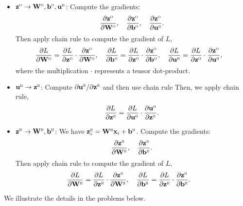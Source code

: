 \documentclass[11pt]{article}
\def\arr{\rightarrow}
\newcommand{\bbf}{\mathbf{b}}
\newcommand{\ubf}{\mathbf{u}}
\newcommand{\xbf}{\mathbf{x}}
\newcommand{\zbf}{\mathbf{z}}
\newcommand{\Wbf}{\mathbf{W}}
\def\hid{\textsc{\tiny H}}
\def\out{\textsc{\tiny O}}
\begin{document}
\begin{itemize}
\begin{itemize}
\item $\zbf^\out \arr \Wbf^\out, \bbf^\out, \ubf^\hid$: Compute the gradients:
\[
    \frac{\partial \zbf^\out}{\partial \Wbf^\out}, \quad
    \frac{\partial \zbf^\out}{\partial \bbf^\out}, \quad
    \frac{\partial \zbf^\out}{\partial \ubf^\hid}.
\]
Then apply chain rule to compute the gradient of $L$,
\begin{align*}
    \frac{\partial L}{\partial \Wbf^\out} &= \frac{\partial L}{\partial \zbf^\out} \cdot \frac{\partial \zbf^\out}{\partial \Wbf^\out}, \quad
    \frac{\partial L}{\partial \bbf^\out} = \frac{\partial L}{\partial \zbf^\out} \cdot \frac{\partial \zbf^\out}{\partial \bbf^\out}, \quad
    \frac{\partial L}{\partial \ubf^\hid} = \frac{\partial L}{\partial \zbf^\out} \cdot \frac{\partial \zbf^\out}{\partial \ubf^\hid},
\end{align*}
where the multiplication $\cdot$ represents a tensor dot-product.

\item $\ubf^\hid \arr \zbf^\hid$: Compute $\partial \ubf^\hid/\partial \zbf^\hid$ and then use chain rule
Then, we apply chain rule,
\[
    \frac{\partial L}{\partial \zbf^\hid} = \frac{\partial L}{\partial \ubf^\hid} \cdot \frac{\partial \ubf^\hid}{\partial \zbf^\hid}.
\]

\item $\zbf^\hid \arr \Wbf^\hid, \bbf^\hid$:
We have $\zbf^\hid_i = \Wbf^\hid \xbf_i+ \bbf^\hid$.  Compute the gradients:
\[
    \frac{\partial \zbf^\hid}{\partial \Wbf^\hid}, \quad
    \frac{\partial \zbf^\hid}{\partial \bbf^\hid}.
\]
Then apply chain rule to compute the gradient of $L$,
\begin{align*}
    \frac{\partial L}{\partial \Wbf^\hid} &= \frac{\partial L}{\partial \zbf^\hid} \cdot \frac{\partial \zbf^\hid}{\partial \Wbf^\hid}, \quad
    \frac{\partial L}{\partial \bbf^\hid} = \frac{\partial L}{\partial \zbf^\hid} \cdot \frac{\partial \zbf^\hid}{\partial \bbf^\hid}.
\end{align*}
\end{itemize}
We illustrate the details in the problems below.
\end{itemize}
\end{document}
